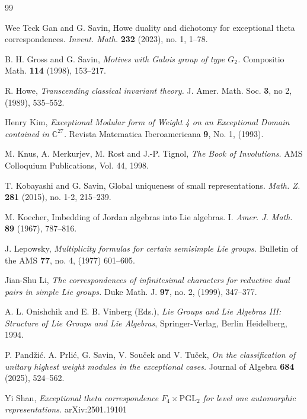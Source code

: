 \documentclass[11pt]{amsart}
\theoremstyle{plain}
\numberwithin{equation}{section}
\newcommand{\PGL}{{\mathrm{PGL}}}
\begin{document}

\begin{thebibliography}{99}

Wee Teck Gan and G. Savin, 
Howe duality and dichotomy for exceptional theta correspondences. 
\textit{Invent. Math.} {\bf 232} (2023), no. 1, 1--78.


 B. H. Gross and G. Savin, 
 {\em Motives with Galois group of type $G_2$.}
Compositio Math.  {\bf 114} (1998), 153--217.

 R. Howe, 
 {\em Transcending  classical invariant theory.} 
J. Amer. Math. Soc. {\bf 3}, no 2, (1989), 535--552.  


 Henry Kim,
 {\em Exceptional Modular form of Weight 4 on an
Exceptional Domain contained in $\mathbb C^{27}$.} 
Revista Matematica Iberoamericana {\bf 9}, No. 1, (1993).

 M. Knus, A. Merkurjev, M. Rost and J.-P. Tignol,
  {\em The Book of Involutions.}  AMS Colloquium Publications,
  Vol. 44, 1998.
  
  
T. Kobayashi and G. Savin, 
Global uniqueness of small representations. 
\textit{Math. Z.} {\bf 281} (2015), no. 1-2, 215--239.

M. Koecher, 
Imbedding of Jordan algebras into Lie algebras. I. 
\textit{Amer. J. Math.} {\bf 89} (1967), 787--816.

 J. Lepowsky, 
 {\em Multiplicity formulas for certain semisimple Lie groups.} 
 Bulletin of the AMS {\bf 77}, no. 4,  (1977) 601--605. 


  
  Jian-Shu Li, {\em The correspondences of infinitesimal
characters for reductive dual pairs in simple Lie groups.} Duke
Math. J. {\bf 97}, no. 2, (1999), 347--377.
  
     
   A. L. Onishchik and E. B. Vinberg (Eds.), 
{\em Lie Groups and Lie Algebras III: Structure of Lie Groups and Lie Algebras}, 
Springer-Verlag, Berlin Heidelberg, 1994.

 P. Pand\v zi\'c. A. Prli\'c, G. Savin, V. Sou\v cek and V. Tu\v cek, 
{\em On the classification of unitary highest weight modules in the exceptional cases.}  
Journal of Algebra {\bf 684} (2025), 524--562.  

 Yi Shan, 
{\em Exceptional theta correspondence $F_4\times \PGL_2$ for level one automorphic representations.} 
arXiv:2501.19101 
    






\end{thebibliography}
\end{document}

